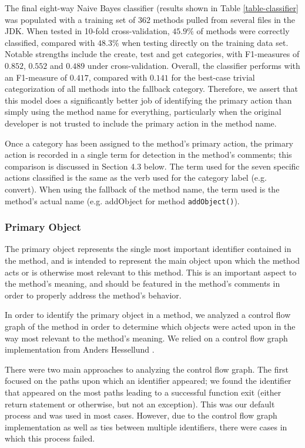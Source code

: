 \documentclass[preprint]{sigplanconf}
\begin{document}
The final eight-way Naive Bayes classifier (results shown in Table \ref{table-classifier} was populated with a training set of \(362\) methods pulled from several files in the JDK. When tested in 10-fold cross-validation, \(45.9\%\) of methods were correctly classified, compared with \(48.3\%\) when testing directly on the training data set. Notable strengths include the create, test and get categories, with F1-measures of \(0.852\), \(0.552\) and \(0.489\) under cross-validation. Overall, the classifier performs with an F1-measure of \(0.417\), compared with \(0.141\) for the best-case trivial categorization of all methods into the fallback category. Therefore, we assert that this model does a significantly better job of identifying the primary action than simply using the method name for everything, particularly when the original developer is not trusted to include the primary action in the method name.

Once a category has been assigned to the method's primary action, the primary action is recorded in a single term for detection in the method's comments; this comparison is discussed in Section 4.3 below. The term used for the seven specific actions classified is the same as the verb used for the category label (e.g. convert). When using the fallback of the method name, the term used is the method's actual name (e.g. addObject for method \verb|addObject()|).

\subsubsection{Primary Object}
The primary object represents the single most important identifier contained in the method, and is intended to represent the main object upon which the method acts or is otherwise most relevant to this method. This is an important aspect to the method's meaning, and should be featured in the method's comments in order to properly address the method's behavior.

In order to identify the primary object in a method, we analyzed a control flow graph of the method in order to determine which objects were acted upon in the way most relevant to the method's meaning. We relied on a control flow graph implementation from Anders Hessellund \cite{hessellund}.

There were two main approaches to analyzing the control flow graph. The first focused on the paths upon which an identifier appeared; we found the identifier that appeared on the most paths leading to a successful function exit (either return statement or otherwise, but not an exception). This was our default process and was used in most cases. However, due to the control flow graph implementation as well as ties between multiple identifiers, there were cases in which this process failed.
\end{document}
